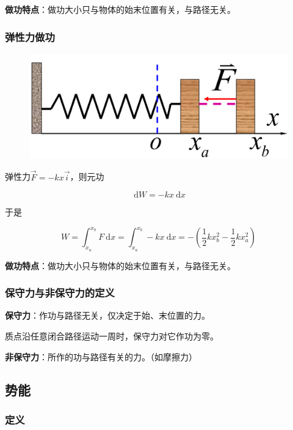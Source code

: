 \documentclass[12pt, a4paper]{article}
\numberwithin{equation}{section}
\newcommand{\rmd}{\mathrm{~d}}
\begin{document}
    \textbf{做功特点}：做功大小只与物体的始末位置有关，与路径无关。

\subsubsection{弹性力做功}

    \begin{figure}
        \centering
        \includegraphics[scale=0.12]{"Chapter 03 images/pic5.png"}
        \label{pic5}
    \end{figure}

    弹性力\(\overrightarrow{F} = -kx\overrightarrow{i}\)，则元功

    \[
        \rmd W = -kx \rmd x
    \]

    于是

    \begin{equation}
        W=\int_{x_a}^{x_b} F \mathrm{~d} x=\int_{x_a}^{x_b}-k x \mathrm{~d} x=-\left(\frac{1}{2} k x_b^2-\frac{1}{2} k x_a^2\right)
    \end{equation}

    \textbf{做功特点}：做功大小只与物体的始末位置有关，与路径无关。

\subsubsection{保守力与非保守力的定义}

    \textbf{保守力}：作功与路径无关，仅决定于始、末位置的力。

    质点沿任意闭合路径运动一周时，保守力对它作功为零。

    \textbf{非保守力}：所作的功与路径有关的力。（如摩擦力）

\subsection{势能}

\subsubsection{定义}
\end{document}
